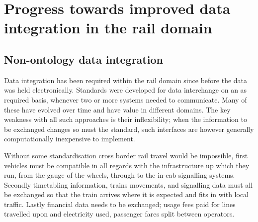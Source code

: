 \section{Progress towards improved data integration in the rail domain}

\subsection{Non-ontology data integration}
Data integration has been required within the rail domain since before the data was held electronically. Standards were developed for data interchange on an as required basis, whenever two or more systems needed to communicate. Many of these have evolved over time and have value in different domains. The key weakness with all such approaches is their inflexibility; when the information to be exchanged changes so must the standard, such interfaces are however generally computationally inexpensive to implement. 

Without some standardisation cross border rail travel would be impossible, first vehicles must be compatible in all regards with the infrastructure up which they run, from the gauge of the wheels, through to the in-cab signalling systems. Secondly timetabling information, trains movements, and signalling data must all be exchanged so that the train arrives where it is expected and fits in with local traffic. Lastly financial data needs to be exchanged; usage fees paid for lines travelled upon and electricity used, passenger fares split between operators.


